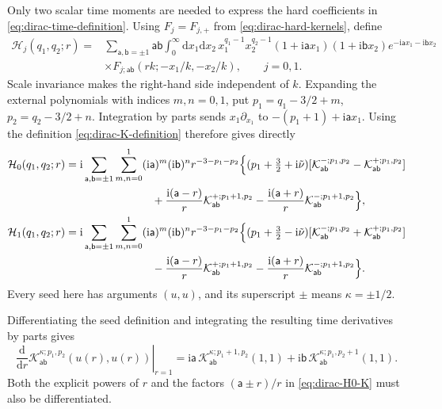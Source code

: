 \documentclass[a4paper,12pt]{article}
\newcommand{\ii}{\mathrm i}
\newcommand{\tn}{\tilde\nu}
\def\aa{\mathsf a}
\newcommand{\bb}{\mathsf b}
\newcommand{\di}{\mathrm d}
\begin{document}
Only two scalar time moments are needed to express the hard
coefficients in \eqref{eq:dirac-time-definition}. Using
$F_j=F_{j,+}$ from \eqref{eq:dirac-hard-kernels}, define
\begin{align}
 \mathcal H_j(q_1,q_2;r)
 ={}&\sum_{\aa,\bb=\pm1}\aa\bb
 \int_0^\infty\di x_1\di x_2\,
 x_1^{q_1-1}x_2^{q_2-1}
 (1+\ii\aa x_1)(1+\ii\bb x_2)e^{-\ii\aa x_1-\ii\bb x_2}
 \nonumber\\
 &\times F_{j;\aa\bb}(rk;-x_1/k,-x_2/k),\qquad j=0,1.
 \label{eq:dirac-H-definition}
\end{align}
Scale invariance makes the right-hand side independent of $k$.
Expanding the external polynomials with indices $m,n=0,1$, put
$p_1=q_1-3/2+m$, $p_2=q_2-3/2+n$.
Integration by parts sends $x_1\partial_{x_1}$ to
$-(p_1+1)+\ii\aa x_1$. Using the definition \eqref{eq:dirac-K-definition}
therefore gives directly
\begin{align}
 \mathcal H_0(q_1,q_2;r)
 ={}&\ii
 \sum_{\aa,\bb=\pm1}\sum_{m,n=0}^1
 (\ii\aa)^m(\ii\bb)^n r^{-3-p_1-p_2}
 \Big\{(p_1+\tfrac32+\ii\tn)
 [\mathcal K_{\aa\bb}^{-;p_1,p_2}-\mathcal K_{\aa\bb}^{+;p_1,p_2}]
 \nonumber\\
 &\hspace{23mm}
 +\frac{\ii(\aa-r)}r\mathcal K_{\aa\bb}^{+;p_1+1,p_2}
 -\frac{\ii(\aa+r)}r\mathcal K_{\aa\bb}^{-;p_1+1,p_2}\Big\},
 \label{eq:dirac-H0-K}\\
 \mathcal H_1(q_1,q_2;r)
 ={}&\ii
 \sum_{\aa,\bb=\pm1}\sum_{m,n=0}^1
 (\ii\aa)^m(\ii\bb)^n r^{-3-p_1-p_2}
 \Big\{(p_1+\tfrac32-\ii\tn)
 [\mathcal K_{\aa\bb}^{-;p_1,p_2}+\mathcal K_{\aa\bb}^{+;p_1,p_2}]
 \nonumber\\
 &\hspace{23mm}
 -\frac{\ii(\aa-r)}r\mathcal K_{\aa\bb}^{+;p_1+1,p_2}
 -\frac{\ii(\aa+r)}r\mathcal K_{\aa\bb}^{-;p_1+1,p_2}\Big\}.
 \label{eq:dirac-H1-K}
\end{align}
Every seed here has arguments $(u,u)$, and its superscript $\pm$
means $\kappa=\pm1/2$.

Differentiating the seed definition and integrating the resulting time
derivatives by parts gives
\begin{equation}
 \left.\frac{\di}{\di r}
 \mathcal K_{\aa\bb}^{\kappa;p_1,p_2}(u(r),u(r))\right|_{r=1}
 =\ii\aa\,\mathcal K_{\aa\bb}^{\kappa;p_1+1,p_2}(1,1)
 +\ii\bb\,\mathcal K_{\aa\bb}^{\kappa;p_1,p_2+1}(1,1).
 \label{eq:dirac-K-derivative}
\end{equation}
Both the explicit powers of $r$ and the factors $(\aa\pm r)/r$
in \eqref{eq:dirac-H0-K} must also be differentiated.
\end{document}
